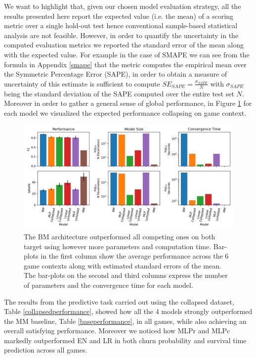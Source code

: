We want to highlight that, given our chosen model evaluation strategy, all the results presented here report the expected value (i.e. the mean) of a scoring metric over a single hold-out test hence conventional sample-based statistical analysis are not feasible. However, in order to quantify the uncertainty in the computed evaluation metrics we reported the standard error of the mean along with the expected value. For example in the case of SMAPE we can see from the formula in Appendix \ref{smape} that the metric computes the empirical mean over the Symmetric Percentage Error (SAPE), in order to obtain a measure of uncertainty of this estimate is sufficient to compute $SE_{SAPE} = \frac{\sigma_{SAPE}}{N}$ with $\sigma_{SAPE}$ being the standard deviation of the SAPE computed over the entire test set $N$. Moreover in order to gather a general sense of global performance, in Figure \ref{model_comp_coll_31} for each model we visualized the expected performance collapsing on game context.

\begin{figure}[h]
\centering
\includegraphics[width=.7\textwidth]{images/chapter_3/global_31.png}
\caption[\textbf{Aggregated comparison of models' performance}]{The BM architecture outperformed all competing ones on both target using however more parameters and computation time. Bar-plots in the first column show the average performance across the 6 game contexts along with estimated standard errors of the mean. The bar-plots on the second and third columns express the number of parameters and the convergence time for each model.}
\label{model_comp_coll_31} 
\end{figure}


The results from the predictive task carried out using the collapsed dataset, Table \ref{collapsedperformance}, showed how all the 4 models strongly outperformed the MM baseline, Table \ref{baseperformance}, in all games, while also achieving an overall satisfying performance. Moreover we noticed how MLPr and MLPc markedly outperformed EN and LR in both churn probability and survival time prediction across all games.  

